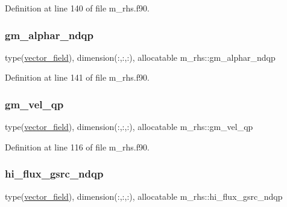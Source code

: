 Definition at line 140 of file m\+\_\+rhs.\+f90.

\mbox{\label{namespacem__rhs_a871a36bf12852bfc85560beba25cbfb9}} 
\subsubsection{\texorpdfstring{gm\+\_\+alphar\+\_\+ndqp}{gm\_alphar\_ndqp}}
{\footnotesize\ttfamily type(\hyperlink{structm__derived__types_1_1vector__field}{vector\+\_\+field}), dimension(\+:,\+:,\+:), allocatable m\+\_\+rhs\+::gm\+\_\+alphar\+\_\+ndqp}



Definition at line 141 of file m\+\_\+rhs.\+f90.

\mbox{\label{namespacem__rhs_ae49e4c2622ff0adf0b066da12e8256c8}} 
\subsubsection{\texorpdfstring{gm\+\_\+vel\+\_\+qp}{gm\_vel\_qp}}
{\footnotesize\ttfamily type(\hyperlink{structm__derived__types_1_1vector__field}{vector\+\_\+field}), dimension(\+:,\+:,\+:), allocatable m\+\_\+rhs\+::gm\+\_\+vel\+\_\+qp}



Definition at line 116 of file m\+\_\+rhs.\+f90.

\mbox{\label{namespacem__rhs_a95522bf6827d87664b25022fe145eddf}} 
\subsubsection{\texorpdfstring{hi\+\_\+flux\+\_\+gsrc\+\_\+ndqp}{hi\_flux\_gsrc\_ndqp}}
{\footnotesize\ttfamily type(\hyperlink{structm__derived__types_1_1vector__field}{vector\+\_\+field}), dimension(\+:,\+:,\+:), allocatable m\+\_\+rhs\+::hi\+\_\+flux\+\_\+gsrc\+\_\+ndqp}




